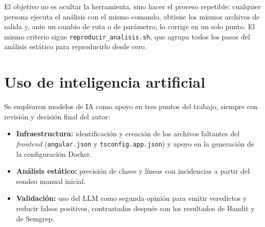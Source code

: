 \documentclass[11pt,letterpaper]{article}
\newcommand{\f}[1]{\texttt{#1}}
\begin{document}
El objetivo no es ocultar la herramienta, sino hacer el proceso repetible: cualquier persona ejecuta el análisis con el mismo comando, obtiene los mismos archivos de salida y, ante un cambio de ruta o de parámetro, lo corrige en un solo punto. El mismo criterio sigue \f{reproducir\_analisis.sh}, que agrupa todos los pasos del análisis estático para reproducirlo desde cero.

\section{Uso de inteligencia artificial}

Se emplearon modelos de IA como apoyo en tres puntos del trabajo, siempre con revisión y decisión final del autor:
\begin{itemize}
  \item \textbf{Infraestructura:} identificación y creación de los archivos faltantes del \textit{frontend} (\f{angular.json} y \f{tsconfig.app.json}) y apoyo en la generación de la configuración Docker.
  \item \textbf{Análisis estático:} precisión de clases y líneas con incidencias a partir del sondeo manual inicial.
  \item \textbf{Validación:} uso del LLM como segunda opinión para emitir veredictos y reducir falsos positivos, contrastados después con los resultados de Bandit y de Semgrep.
\end{itemize}
\end{document}
